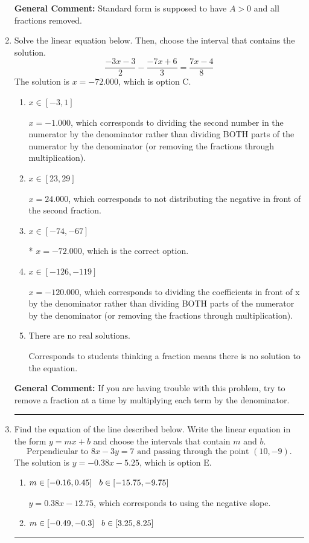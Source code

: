 \documentclass{extbook}[14pt]
\newcommand{\litem}[1]{\item #1

\rule{\textwidth}{0.4pt}}
\begin{document}
\begin{enumerate}
{\textbf{General Comment:} Standard form is supposed to have $A > 0$ and all fractions removed.
}
\litem{
Solve the linear equation below. Then, choose the interval that contains the solution.
\[ \frac{-3x -3}{2} - \frac{-7x + 6}{3} = \frac{7x -4}{8} \]The solution is \( x = -72.000 \), which is option C.\begin{enumerate}[label=\Alph*.]
\item \( x \in [-3, 1] \)

 $x = -1.000$, which corresponds to dividing the second number in the numerator by the denominator rather than dividing BOTH parts of the numerator by the denominator (or removing the fractions through multiplication).
\item \( x \in [23, 29] \)

 $x = 24.000$, which corresponds to not distributing the negative in front of the second fraction.
\item \( x \in [-74, -67] \)

* $x = -72.000$, which is the correct option.
\item \( x \in [-126, -119] \)

 $x = -120.000$, which corresponds to dividing the coefficients in front of x by the denominator rather than dividing BOTH parts of the numerator by the denominator (or removing the fractions through multiplication).
\item \( \text{There are no real solutions.} \)

Corresponds to students thinking a fraction means there is no solution to the equation.
\end{enumerate}

\textbf{General Comment:} If you are having trouble with this problem, try to remove a fraction at a time by multiplying each term by the denominator.
}
\litem{
Find the equation of the line described below. Write the linear equation in the form $ y=mx+b $ and choose the intervals that contain $m$ and $b$.
\[ \text{Perpendicular to } 8 x - 3 y = 7 \text{ and passing through the point } (10, -9). \]The solution is \( y = -0.38x - 5.25 \), which is option E.\begin{enumerate}[label=\Alph*.]
\item \( m \in [-0.16, 0.45] \hspace*{3mm} b \in [-15.75, -9.75] \)

 $y = 0.38x - 12.75$, which corresponds to using the negative slope.
\item \( m \in [-0.49, -0.3] \hspace*{3mm} b \in [3.25, 8.25] \)


\end{enumerate}}
\end{enumerate}
\end{document}
